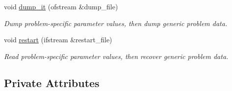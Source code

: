\begin{DoxyCompactItemize}
void \hyperlink{classElasticRingProblem_a5d932c03b49cb7fe4da256a5c3c9be26}{dump\+\_\+it} (ofstream \&dump\+\_\+file)
\begin{DoxyCompactList}\small\item\em Dump problem-\/specific parameter values, then dump generic problem data. \end{DoxyCompactList}\item 
void \hyperlink{classElasticRingProblem_a0b7d864f52a18bb2a9f3a2378d8b02aa}{restart} (ifstream \&restart\+\_\+file)
\begin{DoxyCompactList}\small\item\em Read problem-\/specific parameter values, then recover generic problem data. \end{DoxyCompactList}\end{DoxyCompactItemize}
\subsection*{Private Attributes}
